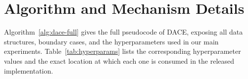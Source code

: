 \documentclass{article}
\newcommand{\method}{\textsc{DACE}\xspace}
\begin{document}
\section{Algorithm and Mechanism Details}
\label{apdx:algorithm}

Algorithm~\ref{alg:dace-full} gives the full pseudocode of \method, exposing all data structures, boundary cases, and the hyperparameters used in our main experiments. Table~\ref{tab:hyperparams} lists the corresponding hyperparameter values and the exact location at which each one is consumed in the released implementation.
\end{document}
